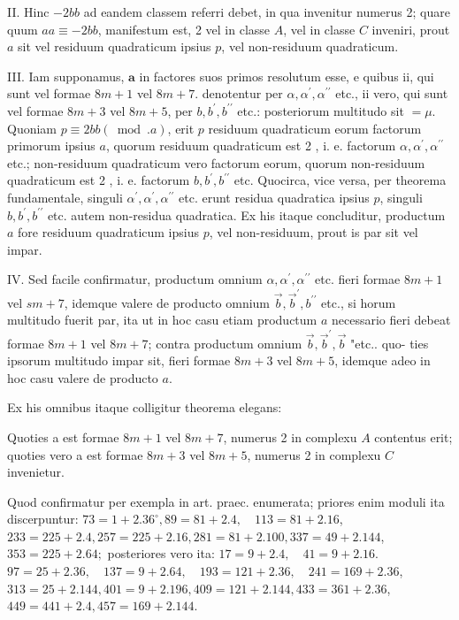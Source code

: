 \documentclass[10pt]{article}
\begin{document}
II. Hinc \(-2 b b\) ad eandem classem referri debet, in qua invenitur numerus 2; quare quum \(a a \equiv-2 b b\), manifestum est, 2 vel in classe \(A\), vel in classe \(C\) inveniri, prout \(a\) sit vel residuum quadraticum ipsius \(p\), vel non-residuum quadraticum.

III. Iam supponamus, \(\boldsymbol{a}\) in factores suos primos resolutum esse, e quibus ii, qui sunt vel formae \(8 m+1\) vel \(8 m+7\). denotentur per \(\alpha, \alpha^{\prime}, \alpha^{\prime \prime}\) etc., ii vero, qui sunt vel formae \(8 m+3\) vel \(8 m+5\), per \(b, b^{\prime}, b^{\prime \prime}\) etc.: posteriorum multitudo sit \(=\mu . \quad\) Quoniam \(p \equiv 2 b b(\bmod . a)\), erit \(p\) residuum quadraticum eorum factorum primorum ipsius \(a\), quorum residuum quadraticum est 2 , i. e. factorum \(\alpha, \alpha^{\prime}, \alpha^{\prime \prime}\) etc.; non-residuum quadraticum vero factorum eorum, quorum non-residuum quadraticum est 2 , i. e. factorum \(b, b^{\prime}, b^{\prime \prime}\) etc. Quocirca, vice versa, per theorema fundamentale, singuli \(\alpha^{\prime}, \alpha^{\prime}, \alpha^{\prime \prime}\) etc. erunt residua quadratica ipsius \(p\), singuli \(b, b^{\prime}, b^{\prime \prime}\) etc. autem non-residua quadratica. Ex his itaque concluditur, productum \(a\) fore residuum quadraticum ipsius \(p\), vel non-residuum, prout is par sit vel impar.

IV. Sed facile confirmatur, productum omnium \(\alpha, \alpha^{\prime}, \alpha^{\prime \prime}\) etc. fieri formae \(8 m+1\) vel \(s m+7\), idemque valere de producto omnium \(\vec{b}, \vec{b}^{\prime}, b^{\prime \prime}\) etc., si horum multitudo fuerit par, ita ut in hoc casu etiam productum \(a\) necessario fieri debeat formae \(8 m+1\) vel \(8 m+7\); contra productum omnium \(\vec{b}, \vec{b}^{\prime}, \vec{b}\) "etc.. quo-
ties ipsorum multitudo impar sit, fieri formae \(8 m+3\) vel \(8 m+5\), idemque adeo in hoc casu valere de producto \(a\).

Ex his omnibus itaque colligitur theorema elegans:

Quoties a est formae \(8 m+1\) vel \(8 m+7\), numerus 2 in complexu \(A\) contentus erit; quoties vero a est formae \(8 m+3\) vel \(8 m+5\), numerus 2 in complexu \(C\) invenietur.

Quod confirmatur per exempla in art. praec. enumerata; priores enim moduli ita discerpuntur: \(73=1+2.36^{\circ}, 89=81+2.4, \quad 113=81+2.16\), \(233=225+2.4,257=225+2.16,281=81+2.100,337=49+2.144\), \(353=225+2.64 ;\) posteriores vero ita: \(17=9+2.4, \quad 41=9+2.16\). \(97=25+2.36, \quad 137=9+2.64, \quad 193=121+2.36, \quad 241=169+2.36\), \(313=25+2.144,401=9+2.196,409=121+2.144,433=361+2.36\), \(449=441+2.4,457=169+2.144\).
\end{document}
